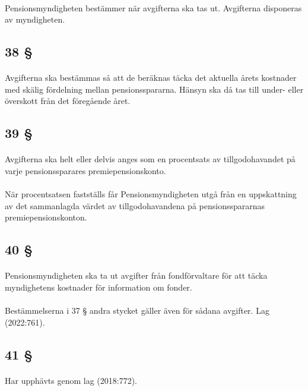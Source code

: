 \documentclass[a4paper,notitlepage,openany,10pt]{book}
\begin{document}
\paragraph*{}
Pensionsmyndigheten bestämmer när avgifterna ska tas ut.
Avgifterna disponeras av myndigheten.
\subsection*{38 §}
\paragraph*{}
Avgifterna ska bestämmas så att de beräknas täcka det aktuella årets kostnader med skälig fördelning mellan pensionsspararna. Hänsyn ska då tas till under- eller överskott från det föregående året.
\subsection*{39 §}
\paragraph*{}
Avgifterna ska helt eller delvis anges som en procentsats av tillgodohavandet på varje pensionssparares premiepensionskonto.
\paragraph*{}
När procentsatsen fastställs får Pensionsmyndigheten utgå från en uppskattning av det sammanlagda värdet av tillgodohavandena på pensionsspararnas premiepensionskonton.
\subsection*{40 §}
\paragraph*{}
Pensionsmyndigheten ska ta ut avgifter från fondförvaltare för att täcka myndighetens kostnader för information om fonder.
\paragraph*{}
Bestämmelserna i 37 § andra stycket gäller även för sådana avgifter.
Lag (2022:761).
\subsection*{41 §}
\paragraph*{}
Har upphävts genom
lag (2018:772).
\end{document}
